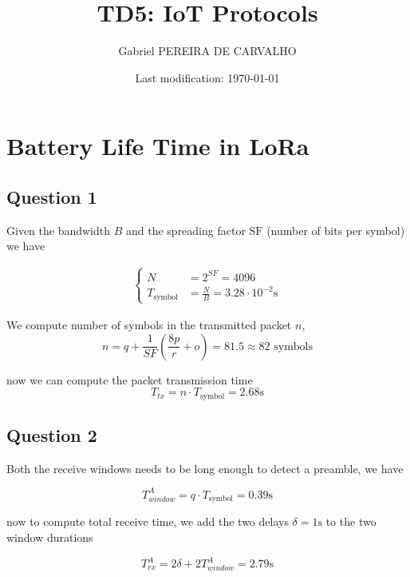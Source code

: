\documentclass[]{article}
\title{TD5: IoT Protocols}
\author{Gabriel PEREIRA DE CARVALHO}
\date{Last modification: \today}
\begin{document}
	
	\maketitle
	
	\section{Battery Life Time in LoRa}
	
	\subsection*{Question 1}
	
	Given the bandwidth $B$ and the spreading factor $\mathrm{SF}$ (number of bits per symbol) we have
	
	\begin{align}
		\begin{cases}
			N &= 2^{SF} = 4096\\
			T_{\text{symbol}} &= \frac{N}{B} = 3.28 \cdot 10^{-2} \mathrm{s}
		\end{cases}
	\end{align}
	
	We compute number of symbols in the transmitted packet $n$,
	\begin{equation}
		n = q + \frac{1}{SF}\left(\frac{8p}{r} + o\right) = 81.5 \approx 82 \text{ symbols}
	\end{equation}
	
	now we can compute the packet transmission time
	\begin{equation}
		T_{tx} = n \cdot T_{\text{symbol}} = 2.68 \mathrm{s}
	\end{equation}
	
	\subsection*{Question 2}
	
	Both the receive windows needs to be long enough to detect a preamble, we have
	
	\begin{equation}
		T_{window}^A = q \cdot T_{\text{symbol}} = 0.39 \mathrm{s}
	\end{equation}
	
	now to compute total receive time, we add the two delays $\delta = 1\mathrm{s}$ to the two window durations
	
	\begin{equation}
		T_{rx}^A = 2\delta + 2T_{window}^A = 2.79 \mathrm{s}
	\end{equation}
	
\end{document}
